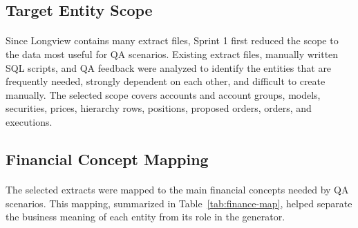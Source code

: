 \subsection{Target Entity Scope}

\paragraph{}Since Longview contains many extract files, Sprint 1 first reduced the scope to the data
most useful for QA scenarios. Existing extract files, manually written SQL scripts, and QA feedback
were analyzed to identify the entities that are frequently needed, strongly dependent on each other,
and difficult to create manually. The selected scope covers accounts and account groups, models,
securities, prices, hierarchy rows, positions, proposed orders, orders, and executions.

\subsection{Financial Concept Mapping}

\paragraph{}The selected extracts were mapped to the main financial concepts needed by QA
scenarios. This mapping, summarized in Table~\ref{tab:finance-map}, helped separate the business
meaning of each entity from its role in the generator.

